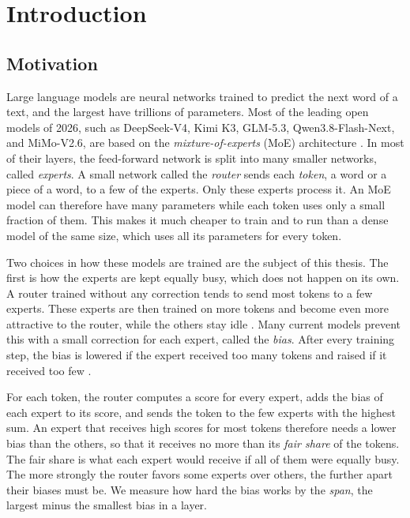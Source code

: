\chapter{Introduction}
\label{sec:introduction}

\section{Motivation}
\label{sec:introduction-motivation}
Large language models are neural networks trained to predict the next word of a text, and the largest have trillions of parameters. Most of the leading open models of 2026, such as DeepSeek-V4, Kimi K3, GLM-5.3, Qwen3.8-Flash-Next, and MiMo-V2.6, are based on the \emph{mixture-of-experts} (MoE) architecture \cite{deepseek2026v4, kimi2026k3, zai2026glm53, qiu2026qwennext, xiaomi2026mimov26}. In most of their layers, the feed-forward network is split into many smaller networks, called \emph{experts}. A small network called the \emph{router} sends each \emph{token}, a word or a piece of a word, to a few of the experts. Only these experts process it. An MoE model can therefore have many parameters while each token uses only a small fraction of them. This makes it much cheaper to train and to run than a dense model of the same size, which uses all its parameters for every token.

Two choices in how these models are trained are the subject of this thesis. The first is how the experts are kept equally busy, which does not happen on its own. A router trained without any correction tends to send most tokens to a few experts. These experts are then trained on more tokens and become even more attractive to the router, while the others stay idle \cite{shazeer2017outrageously}. Many current models prevent this with a small correction for each expert, called the \emph{bias}. After every training step, the bias is lowered if the expert received too many tokens and raised if it received too few \cite{wang2024lossfree}.

For each token, the router computes a score for every expert, adds the bias of each expert to its score, and sends the token to the few experts with the highest sum. An expert that receives high scores for most tokens therefore needs a lower bias than the others, so that it receives no more than its \emph{fair share} of the tokens. The fair share is what each expert would receive if all of them were equally busy. The more strongly the router favors some experts over others, the further apart their biases must be. We measure how hard the bias works by the \emph{span}, the largest minus the smallest bias in a layer.

